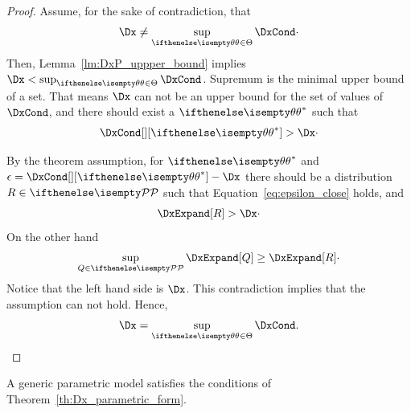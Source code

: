 \begin{proof}
    Assume, for the sake of contradiction, that
    \[
        \Dx \neq \supParam \DxCond \cdot
    \]
    Then, Lemma~\ref{lm:DxP_uppper_bound} implies $\Dx < \supParam \DxCond$.
    Supremum is the minimal upper bound of a set.
    That means $\Dx$ can not be an upper bound for the set of values of $\DxCond$,
    and there should exist a $\paramValue^{*}$ such that
    \[
        \DxCond[][\paramValue^{*}] > \Dx \cdot
    \]

    By the theorem assumption, for $\paramValue^{*}$ and $\epsilon = \DxCond[][\paramValue^{*}] - \Dx$ there should be a
    distribution $R \in \set{P}$ such that Equation~\ref{eq:epsilon_close} holds, and
    \begin{align*}
        \DxExpand[R] > \Dx  \cdot
    \end{align*}
    On the other hand
    \[
        \supQ \DxExpand[Q] \geq \DxExpand[R] \cdot
    \]
    Notice that the left hand side is $\Dx$.
    This contradiction implies that the assumption can not hold.
    Hence,
    \[
        \Dx = \supParam \DxCond. \qedhere
    \]
\end{proof}

\begin{proposition}
    A generic parametric model satisfies the conditions of Theorem~\ref{th:Dx_parametric_form}.
\end{proposition}





